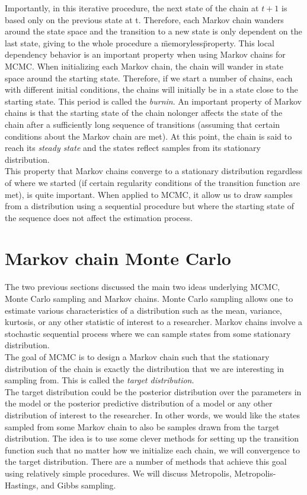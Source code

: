 Importantly, in this iterative procedure, the next state of the chain at $t+1$ is based only on the previous state at t. Therefore, each Markov chain wanders around the state space and the transition to a new state is only dependent on the last state, giving to the whole procedure a \"memoryless\" property.
This local dependency behavior is an important property when using Markov chains for MCMC.
When initializing each Markov chain, the chain will wander in state space around the
starting state. Therefore, if we start a number of chains, each with different initial conditions, the chains will initially be in a state close to the starting state. This period is called the \textit{burnin}. An important property of Markov chains is that the starting state of the chain nolonger affects the state of the chain after a sufficiently long sequence of transitions (assuming that certain conditions about the Markov chain are met). At this point, the chain is said to reach its \textit{steady state} and the states reflect samples from its stationary distribution.
\\ This property that Markov chains converge to a stationary distribution regardless of where we started (if certain regularity conditions of the transition function are met), is quite important.
When applied to MCMC, it allow us to draw samples from a distribution using a sequential
procedure but where the starting state of the sequence does not affect the estimation process.
\newpage
\section{Markov chain Monte Carlo}
The two previous sections discussed the main two ideas underlying MCMC, Monte Carlo
sampling and Markov chains. Monte Carlo sampling allows one to estimate various characteristics of a distribution such as the mean, variance, kurtosis, or any other statistic of interest to a researcher. Markov chains involve a stochastic sequential process where we can sample states from some stationary distribution.\\
The goal of MCMC is to design a Markov chain such that the stationary distribution of
the chain is exactly the distribution that we are interesting in sampling from. This is called the \textit{target distribution}.\\
The target distribution could be the posterior distribution over the parameters in the model or the posterior predictive distribution of a model or any other distribution of interest to the researcher. 
In other words, we would like the states sampled from some Markov chain to also be samples drawn from the target distribution. The idea is to use some clever methods for setting up the transition function such that no matter how we initialize each chain, we will convergence to the target distribution. There are a number of methods that
achieve this goal using relatively simple procedures. We will discuss Metropolis, Metropolis-Hastings, and Gibbs sampling.
